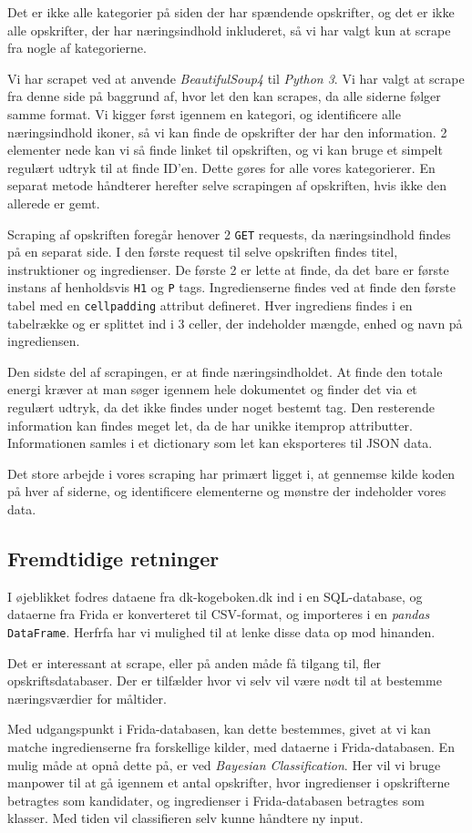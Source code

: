 \documentclass[a4paper,]{article}
\begin{document}
Det er ikke alle kategorier på siden der har spændende opskrifter, og det er ikke alle opskrifter, der har næringsindhold inkluderet, så vi har valgt kun at scrape fra nogle af kategorierne. 

Vi har scrapet ved at anvende \textit{BeautifulSoup4} til
\textit{Python 3}. Vi har valgt at scrape fra denne side på baggrund
af, hvor let den kan scrapes, da alle siderne følger samme format. Vi
kigger først igennem en kategori, og identificere alle næringsindhold
ikoner, så vi kan finde de opskrifter der har den information. 2
elementer nede kan vi så finde linket til opskriften, og vi kan bruge
et simpelt regulært udtryk til at finde ID’en. Dette gøres for alle
vores kategorierer. En separat metode håndterer herefter selve
scrapingen af opskriften, hvis ikke den allerede er gemt.

Scraping af opskriften foregår henover 2 \texttt{GET} requests, da
næringsindhold findes på en separat side. I den første request til
selve opskriften findes titel, instruktioner og ingredienser. De
første 2 er lette at finde, da det bare er første instans af
henholdsvis \texttt{H1} og \texttt{P} tags. Ingredienserne findes ved
at finde den første tabel med en \texttt{cellpadding} attribut
defineret. Hver ingrediens findes i en tabelrække og er splittet ind i
3 celler, der indeholder mængde, enhed og navn på ingrediensen.

Den sidste del af scrapingen, er at finde næringsindholdet. At finde
den totale energi kræver at man søger igennem hele dokumentet og
finder det via et regulært udtryk, da det ikke findes under noget
bestemt tag. Den resterende information kan findes meget let, da de
har unikke itemprop attributter. Informationen samles i et dictionary
som let kan eksporteres til JSON data.

Det store arbejde i vores scraping har primært ligget i, at gennemse
kilde koden på hver af siderne, og identificere elementerne og mønstre
der indeholder vores data.

\subsection{Fremdtidige retninger}

I øjeblikket fodres dataene fra dk-kogeboken.dk ind i en SQL-database,
og dataerne fra Frida er konverteret til CSV-format, og importeres i
en \textit{pandas} \texttt{DataFrame}.  Herfrfa har vi mulighed til at
lenke disse data op mod hinanden.

Det er interessant at scrape, eller på anden måde få tilgang til, fler
opskriftsdatabaser.  Der er tilfælder hvor vi selv vil være nødt til
at bestemme næringsværdier for måltider.

Med udgangspunkt i Frida-databasen, kan dette bestemmes, givet at vi
kan matche ingredienserne fra forskellige kilder, med dataerne i
Frida-databasen.  En mulig måde at opnå dette på, er ved
\textit{Bayesian Classification}.  Her vil vi bruge manpower til at gå
igennem et antal opskrifter, hvor ingredienser i opskrifterne
betragtes som kandidater, og ingredienser i Frida-databasen betragtes
som klasser.  Med tiden vil classifieren selv kunne håndtere ny input.
\end{document}
